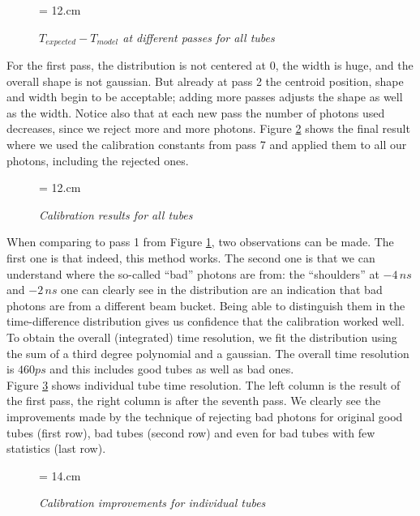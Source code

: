 \documentclass [12pt,letterpaper]{article}
\begin{document}
\begin{figure} [h]
\begin{center}
\epsfxsize = 12.cm
\caption {\it $T_{expected} - T_{model}$ at different passes for all tubes}
\label{fig:calib_steps}
\end{center}
\end{figure}

For the first pass, the distribution is not centered at 0, the width is huge, and the overall shape is not gaussian. But already at pass 2 the centroid position, shape and width begin to be acceptable; adding more passes adjusts the shape as well as the width. Notice also that at each new pass the number of photons used decreases, since we reject more and more photons. Figure \ref{fig:final_calib} shows the final result where we used the calibration constants from pass 7 and applied them to all our photons, including the rejected ones.

\begin{figure} [h]
\begin{center}
\epsfxsize = 12.cm
\caption {\it Calibration results for all tubes}
\label{fig:final_calib}
\end{center}
\end{figure}

When comparing to pass 1 from Figure \ref{fig:calib_steps}, two observations can be made. The first one is that indeed, this method works. The second one is that we can understand where the so-called ``bad'' photons are from: the ``shoulders'' at $-4 \, ns$ and $-2\, ns$ one can clearly see  in the distribution are an indication that bad photons are from a different beam bucket. Being able to distinguish them in the time-difference distribution gives us confidence that the calibration worked well. To obtain the overall (integrated) time resolution, we fit the distribution using the sum of a third degree polynomial and a gaussian. The overall time resolution is $460 ps$ and this includes good tubes as well as bad ones.\\
Figure \ref{fig:tubes_resolution} shows individual tube time resolution. The left column is the result of the first pass, the right column is after the seventh pass. We clearly see the improvements made by the technique of rejecting bad photons for original good tubes (first row), bad tubes (second row) and even for bad tubes with few statistics (last row).

\begin{figure} [h]
\begin{center}
\epsfxsize = 14.cm
\caption {\it Calibration improvements for individual tubes}
\label{fig:tubes_resolution}
\end{center}
\end{figure}
\end{document}

